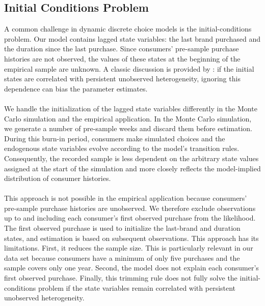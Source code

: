 \subsection{Initial Conditions Problem}
A common challenge in dynamic discrete choice models is the initial-conditions problem. Our model contains lagged state variables: the last brand purchased and the duration since the last purchase. Since consumers' pre-sample purchase histories are not observed, the values of these states at the beginning of the empirical sample are unknown. A classic discussion is provided by \cite{NBERc8909}: if the initial states are correlated with persistent unobserved heterogeneity, ignoring this dependence can bias the parameter estimates.
\\
\\
We handle the initialization of the lagged state variables differently in the Monte Carlo simulation and the empirical application. In the Monte Carlo simulation, we generate a number of pre-sample weeks and discard them before estimation. During this burn-in period, consumers make simulated choices and the endogenous state variables evolve according to the model's transition rules. Consequently, the recorded sample is less dependent on the arbitrary state values assigned at the start of the simulation and more closely reflects the model-implied distribution of consumer histories.
\\
\\
This approach is not possible in the empirical application because consumers' pre-sample purchase histories are unobserved. We therefore exclude observations up to and including each consumer's first observed purchase from the likelihood. The first observed purchase is used to initialize the last-brand and duration states, and estimation is based on subsequent observations. This approach has its limitations. First, it reduces the sample size. This is particularly relevant in our data set because consumers have a minimum of only five purchases and the sample covers only one year. Second, the model does not explain each consumer's first observed purchase. Finally, this trimming rule does not fully solve the initial-conditions problem if the state variables remain correlated with persistent unobserved heterogeneity.

